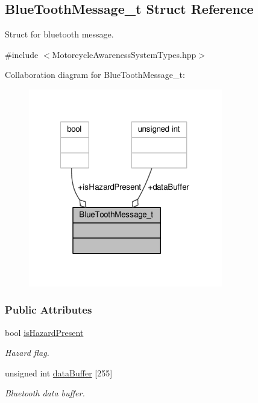\hypertarget{structBlueToothMessage__t}{\subsection{Blue\-Tooth\-Message\-\_\-t Struct Reference}
\label{structBlueToothMessage__t}
}


Struct for bluetooth message.  




{\ttfamily \#include $<$Motorcycle\-Awareness\-System\-Types.\-hpp$>$}



Collaboration diagram for Blue\-Tooth\-Message\-\_\-t\-:\nopagebreak
\begin{figure}[H]
\begin{center}
\leavevmode
\includegraphics[width=240pt]{structBlueToothMessage__t__coll__graph}
\end{center}
\end{figure}
\subsubsection*{Public Attributes}
\begin{DoxyCompactItemize}
\item 
bool \hyperlink{structBlueToothMessage__t_a2dd315aa1cba1d2d3045e26b9f171e61}{is\-Hazard\-Present}
\begin{DoxyCompactList}\small\item\em Hazard flag. \end{DoxyCompactList}\item 
unsigned int \hyperlink{structBlueToothMessage__t_ab872789a32f068dae8bcf77122256b78}{data\-Buffer} \mbox{[}255\mbox{]}
\begin{DoxyCompactList}\small\item\em Bluetooth data buffer. \end{DoxyCompactList}\end{DoxyCompactItemize}


